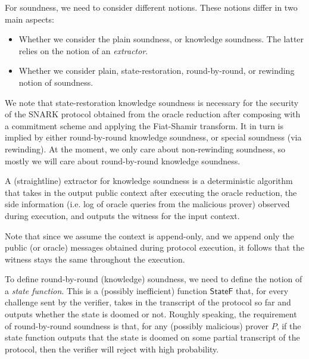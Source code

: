For soundness, we need to consider different notions. These notions differ in two main aspects:
\begin{itemize}
    \item Whether we consider the plain soundness, or knowledge soundness. The latter relies on the
    notion of an \emph{extractor}.
    \item Whether we consider plain, state-restoration, round-by-round, or rewinding notion of
    soundness.
\end{itemize}

We note that state-restoration knowledge soundness is necessary for the security of the SNARK
protocol obtained from the oracle reduction after composing with a commitment scheme and applying
the Fiat-Shamir transform. It in turn is implied by either round-by-round knowledge soundness, or
special soundness (via rewinding). At the moment, we only care about non-rewinding soundness, so mostly we will care about round-by-round knowledge soundness.

\begin{definition}[Soundness]
    \label{def:soundness}
\end{definition}

A (straightline) extractor for knowledge soundness is a deterministic algorithm that takes in the output public context after executing the oracle reduction, the side information (i.e. log of oracle queries from the malicious prover) observed during execution, and outputs the witness for the input context.

Note that since we assume the context is append-only, and we append only the public (or oracle)
messages obtained during protocol execution, it follows that the witness stays the same throughout
the execution.

\begin{definition}
    \label{def:knowledge_soundness}
\end{definition}

To define round-by-round (knowledge) soundness, we need to define the notion of a \emph{state function}. This is a (possibly inefficient) function $\mathsf{StateF}$ that, for every challenge sent by the verifier, takes in the transcript of the protocol so far and outputs whether the state is doomed or not. Roughly speaking, the requirement of round-by-round soundness is that, for any (possibly malicious) prover $P$, if the state function outputs that the state is doomed on some partial transcript of the protocol, then the verifier will reject with high probability.

